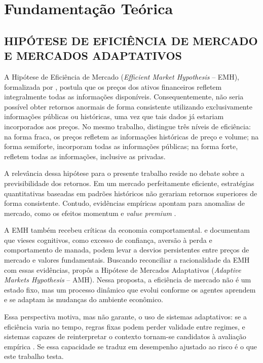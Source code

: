 \chapter{Fundamentação Teórica}
\label{cha:fundamentacao}

\section{HIPÓTESE DE EFICIÊNCIA DE MERCADO E MERCADOS ADAPTATIVOS}

A Hipótese de Eficiência de Mercado (\textit{Efficient Market Hypothesis} -- EMH), formalizada por \citet{Fama1970}, postula que os preços dos ativos financeiros refletem integralmente todas as informações disponíveis. Consequentemente, não seria possível obter retornos anormais de forma consistente utilizando exclusivamente informações públicas ou históricas, uma vez que tais dados já estariam incorporados aos preços. No mesmo trabalho, \citet{Fama1970} distingue três níveis de eficiência: na forma fraca, os preços refletem as informações históricas de preço e volume; na forma semiforte, incorporam todas as informações públicas; na forma forte, refletem todas as informações, inclusive as privadas.

A relevância dessa hipótese para o presente trabalho reside no debate sobre a previsibilidade dos retornos. Em um mercado perfeitamente eficiente, estratégias quantitativas baseadas em padrões históricos não gerariam retornos superiores de forma consistente. Contudo, evidências empíricas apontam para anomalias de mercado, como os efeitos momentum e \textit{value premium} \citep{FamaFrench1992, JegadeeshTitman1993}.

A EMH também recebeu críticas da economia comportamental. \citet{Shiller2000} e \citet{Thaler1993} documentam que vieses cognitivos, como excesso de confiança, aversão à perda e comportamento de manada, podem levar a desvios persistentes entre preços de mercado e valores fundamentais. Buscando reconciliar a racionalidade da EMH com essas evidências, \citet{Lo2004} propôs a Hipótese de Mercados Adaptativos (\textit{Adaptive Markets Hypothesis} -- AMH). Nessa proposta, a eficiência de mercado não é um estado fixo, mas um processo dinâmico que evolui conforme os agentes aprendem e se adaptam às mudanças do ambiente econômico.

Essa perspectiva motiva, mas não garante, o uso de sistemas adaptativos: se a eficiência varia no tempo, regras fixas podem perder validade entre regimes, e sistemas capazes de reinterpretar o contexto tornam-se candidatos à avaliação empírica \citep{Lo2004}. Se essa capacidade se traduz em desempenho ajustado ao risco é o que este trabalho testa.

